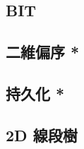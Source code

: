 \documentclass[a4paper,10pt,twocolumn,oneside]{article}
\begin{document}
\subsection{BIT}


\subsection{二維偏序 *}


\subsection{持久化 *}


\subsection{2D 線段樹}


% 

% 

% 

% 

%

%
\end{document}

